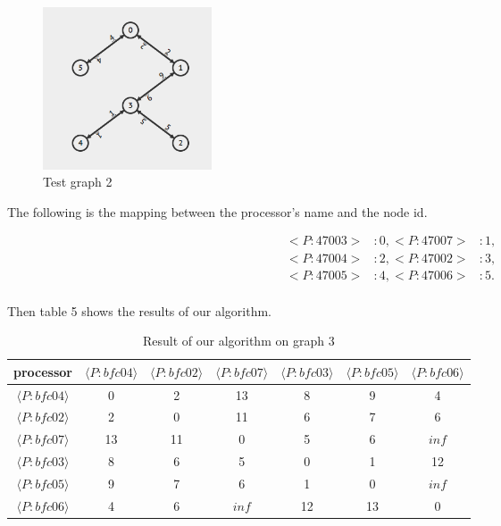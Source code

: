 \documentclass[11pt]{article}  %
\begin{document}
\begin{figure}[ht]
\centering
\includegraphics[width=5cm]{CP3_440Tree/CP3_440.png}
\caption{Test graph 2}
\end{figure}\par

The following is the mapping between the processor's name and the node id.\par

\begin{equation}\nonumber
\begin{aligned}
<P:47003>&: 0,
<P:47007>&: 1, \\
<P:47004>&: 2,
<P:47002>&: 3, \\
<P:47005>&: 4,
<P:47006>&: 5. \\
\end{aligned}
\end{equation}\par

Then table 5 shows the results of our algorithm.\par

\begin{table}[!htbp]
\centering
\setlength{\tabcolsep}{1mm}
\begin{tabular}{|c|c|c|c|c|c|c|}
\hline
processor&$\langle P:bfc04 \rangle$&$\langle P:bfc02\rangle$&$\langle P:bfc07\rangle$&$\langle P:bfc03\rangle$&$\langle P:bfc05\rangle$&$\langle P:bfc06\rangle$\\
\hline
$\langle P:bfc04\rangle$&0&2&13&8&9&4\\
\hline
$\langle P:bfc02\rangle$&2&0&11&6&7&6\\
\hline
$\langle P:bfc07\rangle$&13&11&0&5&6&$inf$\\
\hline
$\langle P:bfc03\rangle$&8&6&5&0&1&12\\
\hline
$\langle P:bfc05\rangle$&9&7&6&1&0&$inf$\\
\hline
$\langle P:bfc06\rangle$&4&6&$inf$&12&13&0\\
\hline
\end{tabular}
\caption{Result of our algorithm on graph 3}
\end{table}\par
\end{document}
